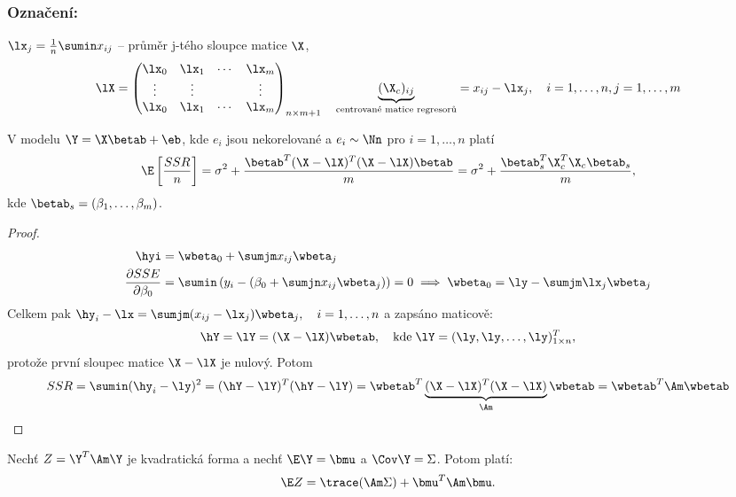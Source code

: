 
\subsubsection*{Označení:}
$\lx_j = \frac{1}{n} \sumin x_{ij}$ -- průměr j-tého sloupce matice $\X$,
$$
	\lX = \begin{pmatrix}
	\lx_0 & \lx_1 & \cdots & \lx_m \\
	\vdots & \vdots & & \vdots \\
	\lx_0 & \lx_1 & \cdots & \lx_m
	\end{pmatrix}_{n \times m+1} \quad \underbrace{(\X_c)_{ij}}_{\text{centrované matice regresorů}} = x_{ij} - \lx_j, \quad i = 1, \dots, n, j = 1, \dots, m
$$

\begin{theorem}
	V modelu $\Y = \X \betab + \eb$, kde $e_i$ jsou nekorelované a $e_i \sim \Nn$ pro $i = 1, \dots, n$ platí
	$$
		\E \left[ \frac{SSR}{n} \right] = \sigma^2 + \frac{\betab^T(\X - \lX)^T(\X - \lX) \betab}{m} = \sigma^2 + \frac{\betab_s^T \X_c^T \X_c \betab_s}{m},
	$$
	kde $\betab_s = (\beta_1, \dots, \beta_m)$.
\end{theorem}

\begin{proof}
	
\begin{align*}
	\hyi & = \wbeta_0 + \sumjm x_{ij} \wbeta_j \\
	\frac{\partial SSE}{\partial \beta_0} & = \sumin \left( y_i - (\beta_0 + \sumjn x_{ij} \wbeta_j) \right) = 0 \implies \wbeta_0 = \ly - \sumjm \lx_j \wbeta_j
\end{align*}
Celkem pak $\hy_i - \lx = \sumjm (x_{ij} - \lx_j) \wbeta_j, \quad i = 1, \dots, n$ a zapsáno maticově: 
$$
\hY = \lY = (\X - \lX) \wbetab, \quad \text{kde} \; \lY = (\ly, \ly, \dots, \ly)_{1 \times n}^T,
$$
protože první sloupec matice $\X - \lX$ je nulový. Potom
$$
SSR = \sumin(\hy_i - \ly)^2 = (\hY - \lY)^T(\hY - \lY) = \wbetab^T \underbrace{(\X - \lX)^T(\X - \lX)}_{\Am} \wbetab = \wbetab^T \Am \wbetab
$$

\end{proof}

\begin{theorem}
	Nechť $Z = \Y^T \Am \Y$ je kvadratická forma a nechť $\E \Y = \bmu$ a $\Cov \Y = \Sigma$. Potom platí:
	$$
		\E Z = \trace(\Am \Sigma) + \bmu^T \Am \bmu.
	$$
\end{theorem}

